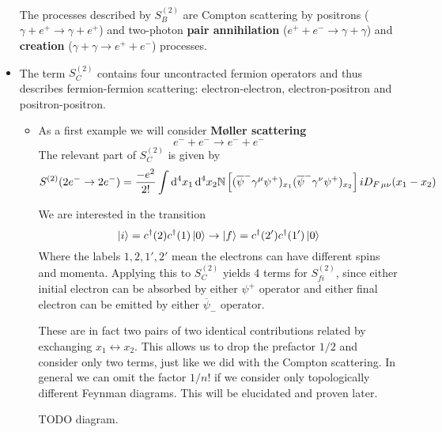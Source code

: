 \begin{itemize}
The processes described by $S^{(2)}_B$ are Compton scattering by positrons ($\gamma + e^+ \to \gamma + e^+$) and two-photon \textbf{pair annihilation} ($e^+ + e^- \to \gamma + \gamma$) and \textbf{creation} ($\gamma + \gamma \to e^+ + e^-$) processes.

\item The term $S^{(2)}_C$ contains four uncontracted fermion operators and thus describes fermion-fermion scattering: electron-electron, electron-positron and positron-positron.
\begin{itemize}
\item As a first example we will consider \textbf{Møller scattering}
\[ e^- + e^- \to e^- + e^- \]
The relevant part of $S^{(2)}_C$ is given by
\[ S^{(2)}(2e^- \to 2e^-) = \frac{-e^2}{2!}\int \operatorname{d \!}{^4 x_1}\operatorname{d \!}{^4 x_2}\mathbb{N} \left[(\overline{\psi}^-\gamma^\mu\psi^+)_{x_1}(\overline{\psi}^-\gamma^\nu\psi^+)_{x_2}\right]iD_{F\,\mu\nu}(x_1-x_2) \]

We are interested in the transition
\[ \left| i \right\rangle = c^\dagger(2)c^\dagger(1)\left| 0 \right\rangle \to \left| f \right\rangle=c^\dagger(2')c^\dagger(1')\left| 0 \right\rangle \]
Where the labels $1,2,1',2'$ mean the electrons can have different spins and momenta.
Applying this to $S^{(2)}_C$ yields 4 terms for $S_{fi}^{(2)}$, since either initial electron can be absorbed by either $\psi^+$ operator and either final electron can be emitted by either $\overline{\psi}_-$ operator.

These are in fact two pairs of two identical contributions related by exchanging $x_1 \leftrightarrow x_2$. This allows us to drop the prefactor $1/2$ and consider only two terms, just like we did with the Compton scattering. In general we can omit the factor $1/n!$ if we consider only topologically different Feynman diagrams. This will be elucidated and proven later.

TODO diagram.


\end{itemize}
\end{itemize}
